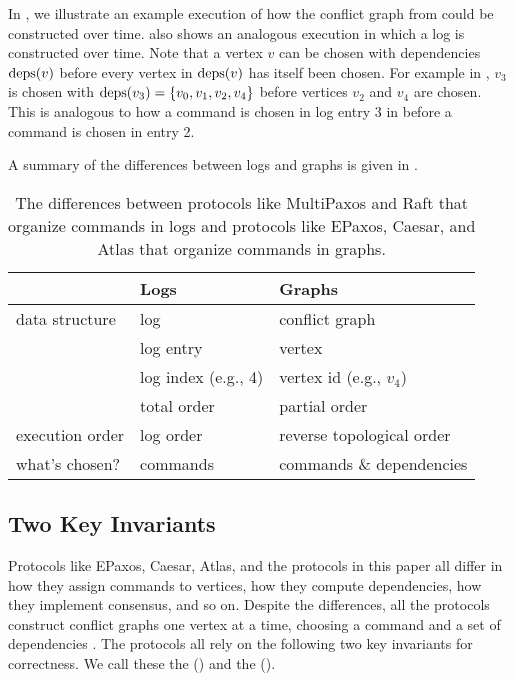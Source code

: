 In , we illustrate an example execution of how
the conflict graph from  could be constructed over time.
 also shows an analogous execution in which a log
is constructed over time. Note that a vertex $v$ can be chosen with
dependencies $\text{deps}(v)$ before every vertex in $\text{deps}(v)$ has itself been
chosen. For example in , $v_3$ is chosen with $\text{deps}(v_3) =
\{v_0, v_1, v_2, v_4\}$ before vertices $v_2$ and $v_4$ are chosen. This is
analogous to how a command is chosen in log entry 3 in  before a
command is chosen in entry 2.

A summary of the differences between logs and graphs is given in
.

{}

\begin{table}
  \caption{%
    The differences between protocols like MultiPaxos and Raft that organize
    commands in logs and protocols like EPaxos, Caesar, and Atlas that organize
    commands in graphs.
  }
  \begin{tabular}{lll}
    \toprule
                    & Logs                & Graphs \\\midrule
    data structure  & log                 & conflict graph \\
                    & log entry           & vertex \\
                    & log index (e.g., 4) & vertex id (e.g., $v_4$) \\
                    & total order         & partial order \\
    execution order & log order           & reverse topological order \\
    what's chosen?  & commands            & commands \& dependencies \\
    \bottomrule
  \end{tabular}
\end{table}

\subsection{Two Key Invariants}
Protocols like EPaxos, Caesar, Atlas, and the \BPaxos{} protocols in this paper
all differ in how they assign commands to vertices, how they compute
dependencies, how they implement consensus, and so on. Despite the differences,
all the protocols construct conflict graphs one vertex at a time, choosing a
%
command and a set of dependencies . The protocols all rely on the following two key invariants for
correctness. We call these the 
() and the 
().

